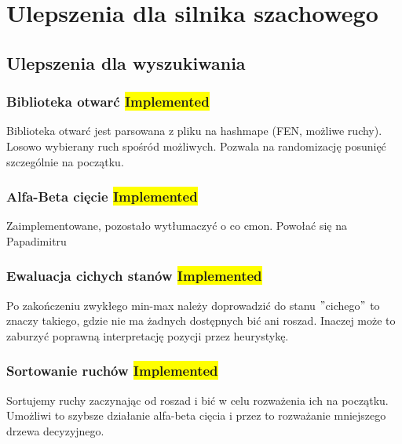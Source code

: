 \chapter{Ulepszenia dla silnika szachowego}
\label{ch:implementacja-silnika-szachowego}


\section{Ulepszenia dla wyszukiwania}
\label{sec:ulepszenia-dla-wyszukiwania}

\subsection{Biblioteka otwarć \colorbox{yellow}{Implemented}}
\label{subsec:biblioteka-otwarc}

{
    \color{red}
    \large Biblioteka otwarć jest parsowana z pliku na hashmape (FEN, możliwe ruchy).
    Losowo wybierany ruch spośród możliwych.
    Pozwala na randomizację posunięć szczególnie na początku.

}

\subsection{Alfa-Beta cięcie \colorbox{yellow}{Implemented}}
\label{subsec:alfa-beta-ciecie}

{
    \color{red}
    \large Zaimplementowane, pozostało wytłumaczyć o co cmon.
Powołać się na Papadimitru
}


\subsection{Ewaluacja cichych stanów \colorbox{yellow}{Implemented}}
\label{subsec:ewaluacja-cichych-stanow}

{
    \color{red}
    \large Po zakończeniu zwykłego min-max należy doprowadzić do stanu \("\)cichego\("\) to znaczy takiego, gdzie nie ma żadnych dostępnych bić ani roszad.
Inaczej może to zaburzyć poprawną interpretację pozycji przez heurystykę.
}


\subsection{Sortowanie ruchów \colorbox{yellow}{Implemented}}
\label{subsec:sortowanie-ruchow}

{
    \color{red}
    \large Sortujemy ruchy zaczynając od roszad i bić w celu rozważenia ich na początku.
    Umożliwi to szybsze działanie alfa-beta cięcia i przez to rozważanie mniejszego drzewa decyzyjnego.
}

